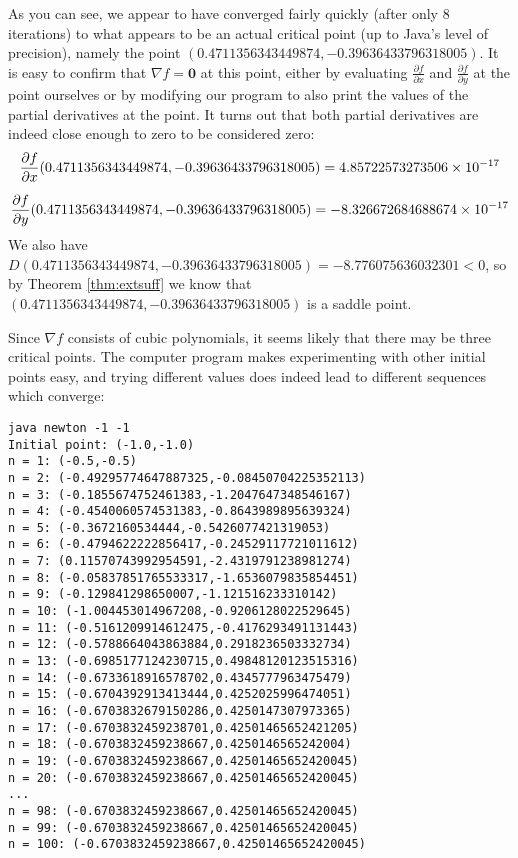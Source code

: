\begin{exmp}
As you can see, we appear to have converged fairly quickly (after only 8 iterations) to what appears to be an actual
critical point (up to Java's level of precision), namely the point
$(0.4711356343449874,-0.39636433796318005)$. It is easy to confirm that $\nabla f = \textbf{0}$ at this point,
either by evaluating $\frac{\partial f}{\partial x}$ and $\frac{\partial f}{\partial y}$ at the point ourselves or by
modifying our program to also print the values of the partial derivatives at the point. It turns out that
both partial derivatives are indeed close enough to zero to be considered zero:
\begin{gather*}
 \frac{\partial f}{\partial x}(0.4711356343449874,-0.39636433796318005) = 4.85722573273506 \times 10^{-17}\vspace{2mm}\\
 \frac{\partial f}{\partial y}(0.4711356343449874,-0.39636433796318005) = -8.326672684688674 \times 10^{-17}
\end{gather*}
We also have $D(0.4711356343449874,-0.39636433796318005) = -8.776075636032301 < 0$, so by
Theorem \ref{thm:extsuff} we know that $(0.4711356343449874,-0.39636433796318005)$ is a saddle point.

Since $\nabla f$ consists of cubic polynomials, it seems likely that there may be three critical points.
The computer program makes experimenting with other initial points easy, and trying different values does indeed lead
to different sequences which converge:

\begin{verbatim}
java newton -1 -1
Initial point: (-1.0,-1.0)
n = 1: (-0.5,-0.5)
n = 2: (-0.49295774647887325,-0.08450704225352113)
n = 3: (-0.1855674752461383,-1.2047647348546167)
n = 4: (-0.4540060574531383,-0.8643989895639324)
n = 5: (-0.3672160534444,-0.5426077421319053)
n = 6: (-0.4794622222856417,-0.24529117721011612)
n = 7: (0.11570743992954591,-2.4319791238981274)
n = 8: (-0.05837851765533317,-1.6536079835854451)
n = 9: (-0.129841298650007,-1.121516233310142)
n = 10: (-1.004453014967208,-0.9206128022529645)
n = 11: (-0.5161209914612475,-0.4176293491131443)
n = 12: (-0.5788664043863884,0.2918236503332734)
n = 13: (-0.6985177124230715,0.49848120123515316)
n = 14: (-0.6733618916578702,0.4345777963475479)
n = 15: (-0.6704392913413444,0.4252025996474051)
n = 16: (-0.6703832679150286,0.4250147307973365)
n = 17: (-0.6703832459238701,0.42501465652421205)
n = 18: (-0.6703832459238667,0.4250146565242004)
n = 19: (-0.6703832459238667,0.42501465652420045)
n = 20: (-0.6703832459238667,0.42501465652420045)
...
n = 98: (-0.6703832459238667,0.42501465652420045)
n = 99: (-0.6703832459238667,0.42501465652420045)
n = 100: (-0.6703832459238667,0.42501465652420045)
\end{verbatim}


\end{exmp}
